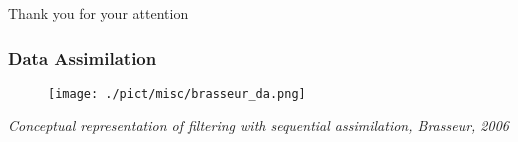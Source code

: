\documentclass[compress,slidescentered,notes=show]{beamer}
\newcommand{\legende}[1]{\textit{\footnotesize #1}}
\begin{document}
%
\begin{frame}
\begin{center}
Thank you for your attention 
\end{center}
\end{frame}
%
\begin{frame}
  \frametitle{Data Assimilation}
  \begin{figure}
    \texttt{[image: ./pict/misc/brasseur\_da.png]}
  \end{figure}
  \legende{Conceptual representation of filtering with sequential assimilation, Brasseur, 2006}
  
\end{frame}
%

 
\end{document}
